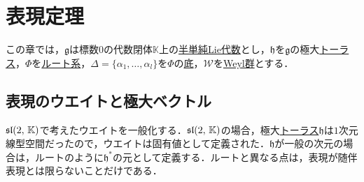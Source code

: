 \documentclass[rep_main]{subfiles}
\begin{document}
\setcounter{chapter}{5}

\chapter{表現定理}
この章では，$\mathfrak{g}$は標数$0$の代数閉体$\mathbb{K}$上の\hyperref[def:semisimple-LieAlg]{半単純Lie代数}とし，$\mathfrak{h}$を$\mathfrak{g}$の極大\hyperref[def:toral-subLieAlg]{トーラス}，$\Phi$を\hyperref[ax:root-system-2]{ルート系}，$\Delta = \{\alpha_1, \ldots, \alpha_l\}$を$\Phi$の\hyperref[def:base-root]{底}，$\mathscr{W}$を\hyperref[def:Weylgroup]{Weyl群}とする．

\section{表現のウエイトと極大ベクトル}
$\mathfrak{sl}(2,\, \mathbb{K})$で考えたウエイトを一般化する．$\mathfrak{sl}(2,\, \mathbb{K})$の場合，極大\hyperref[def:toral-subLieAlg]{トーラス}$\mathfrak{h}$は$1$次元線型空間だったので，ウエイトは固有値として定義された．$\mathfrak{h}$が一般の次元の場合は，ルートのように$\mathfrak{h}^*$の元として定義する．ルートと異なる点は，表現が随伴表現とは限らないことだけである．
\end{document}
